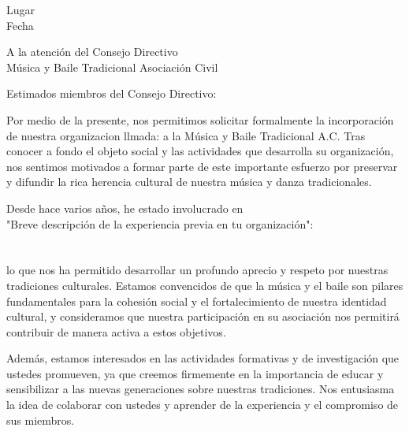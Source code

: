 \documentclass[a4paper,12pt]{letter}
\begin{document}
\begin{flushright}
Lugar
    \underline{\hspace{5cm}} \\ %
Fecha
    \underline{\hspace{5cm}} \\ %
\end{flushright}

\vspace{1cm}



\vspace{1cm}

A la atención del Consejo Directivo \\
 Música y Baile Tradicional Asociación Civil

\vspace{1cm}

Estimados miembros del Consejo Directivo:

Por medio de la presente, nos permitimos solicitar formalmente la incorporación de nuestra organizacion llmada:  \underline{\hspace{10cm}} %
a la Música y Baile Tradicional A.C. Tras conocer a fondo el objeto social y las actividades que desarrolla su organización, nos sentimos motivados a formar parte de este importante esfuerzo por preservar y difundir la rica herencia cultural de nuestra música y danza tradicionales.

Desde hace varios años, he estado involucrado en \\ "Breve descripción de la experiencia previa en tu organización": \underline{\hspace{5.5cm}} \\
 \underline{\hspace{17cm}} \\
 \underline{\hspace{17cm}} \\
lo que nos ha permitido desarrollar un profundo aprecio y respeto por nuestras tradiciones culturales. Estamos convencidos de que la música y el baile son pilares fundamentales para la cohesión social y el fortalecimiento de nuestra identidad cultural, y consideramos que nuestra participación en su asociación nos permitirá contribuir de manera activa a estos objetivos.

Además, estamos interesados en las actividades formativas y de investigación que ustedes promueven, ya que creemos firmemente en la importancia de educar y sensibilizar a las nuevas generaciones sobre nuestras tradiciones. Nos entusiasma la idea de colaborar con ustedes y aprender de la experiencia y el compromiso de sus miembros.
\end{document}
